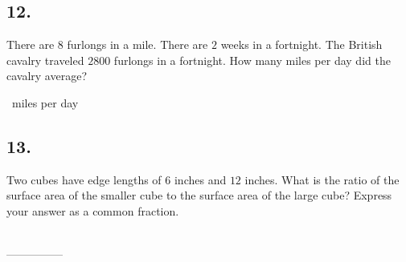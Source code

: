 \documentclass[12pt]{article}
\begin{document}
\subsection*{12.}
There are $8$ furlongs in a mile. There are $2$ weeks in a fortnight. The British cavalry traveled $2800$ furlongs in a fortnight. How many miles per day did the cavalry average?

\fbox{\phantom{ANSWER}}~miles per day

\begin{answer}
%
\end{answer}


\subsection*{13.}
Two cubes have edge lengths of $6$ inches and $12$ inches. What is the ratio of the surface area of the smaller cube to the surface area of the large cube? Express your answer as a common fraction. 

\fbox{\phantom{ANSWER}}\\
\mbox{---------------}\\
\fbox{\phantom{ANSWER}}
\end{document}
